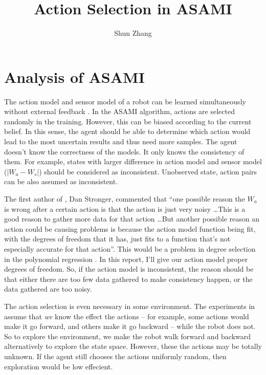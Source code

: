 \documentclass[10pt]{IEEEtran}
\title{Action Selection in ASAMI}
\author{Shun Zhang}
\date{}
\begin{document}
\maketitle


\section{Analysis of ASAMI}

The action model and sensor model of a robot can be learned
simultaneously without external feedback \cite{CSJ06}.  In the ASAMI
algorithm, actions are selected randomly in the training. However,
this can be biased according to the current belief.  In this sense,
the agent should be able to determine which action would lead to the
most uncertain results and thus need more samples.  The agent doesn't
know the correctness of the models. It only knows the consistency of
them. For example, states with larger difference in action model and
sensor model ($|W_a - W_s|$) should be considered as inconsistent.
Unobserved state, action pairs can be also assumed as inconsistent.

The first author of \cite{CSJ06}, Dan Stronger, commented that ``one
possible reason the $W_a$ is wrong after a certain action is that the
action is just very noisy \ldots This is a good reason to gather more
data for that action \ldots  But another possible reason  an action
could be causing problems is because the action model function being
fit, with the degrees of freedom that it has, just fits to a function
that's not especially accurate for that action''. This would be a
problem in degree selection in the polynomial regression \cite{IJAIT08-stronger}. In this report, I'll give our
action model proper degrees of freedom. So, if the action model is
inconsistent, the reason should be that either there are too few data
gathered to make consistency happen, or the data gathered are too
noisy.

\hfill

The action selection is even necessary in some environment. The
experiments in \cite{CSJ06} assume that \textit{we} know the effect
the actions -- for example, some actions would make it go forward, and
others make it go backward -- while the robot does not. So to explore
the environment, we make the robot walk forward and backward
alternatively to explore the state space. However, these the actions
may be totally unknown.  If the agent still chooses the actions uniformly
random, then exploration would be low effecient.
\end{document}
